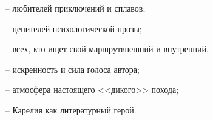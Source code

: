 {
\begin{enumerate}[leftmargin=1cm, itemsep=0pt, topsep=0pt]
	\item[--] любителей приключений и сплавов;
	\item[--] ценителей психологической прозы;
	\item[--] всех, кто ищет свой маршрут\mdash внешний и внутренний.	
\end{enumerate}

\begin{enumerate}[leftmargin=1cm, itemsep=0pt, topsep=0pt]
	\item[--] искренность и сила голоса автора;
	\item[--] атмосфера настоящего <<дикого>> похода;
	\item[--] Карелия как литературный герой.	
\end{enumerate}


%
%

}

\clearpage               

\thispagestyle{plain}   %
%
%

